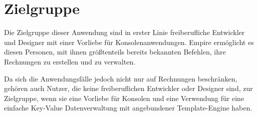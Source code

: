 
\section{Zielgruppe}

Die Zielgruppe dieser Anwendung sind in erster Linie freiberufliche Entwickler und Designer mit einer Vorliebe für Konsolenanwendungen. Empire ermöglicht es diesen Personen, mit ihnen größtenteils bereits bekannten Befehlen, ihre Rechnungen zu erstellen und zu verwalten.

\parskip 12pt

Da sich die Anwendungsfälle jedoch nicht nur auf Rechnungen beschränken, gehören auch Nutzer, die keine freiberuflichen Entwickler oder Designer sind, zur Zielgruppe, wenn sie eine Vorliebe für Konsolen und eine Verwendung für eine einfache Key-Value Datenverwaltung mit angebundener Template-Engine haben.
